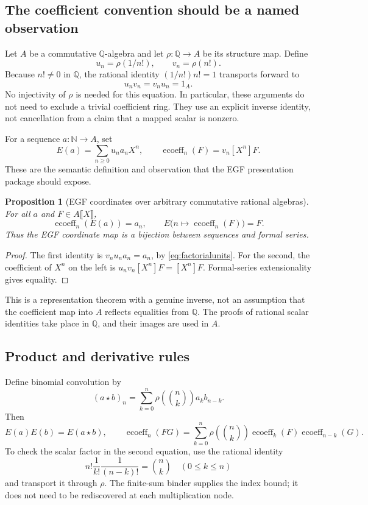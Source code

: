 \documentclass[11pt,a4paper]{article}
\newcommand{\N}{\mathbb N}
\newcommand{\Q}{\mathbb Q}
\newcommand{\ecoeff}{\operatorname{ecoeff}}
\newtheorem{proposition}{Proposition}[section]
\theoremstyle{definition}
\begin{document}
\subsection{The coefficient convention should be a named observation}
Let \(A\) be a commutative \(\Q\)-algebra and let \(\rho:\Q\to A\) be its
structure map. Define
\[
 u_n=\rho(1/n!),\qquad v_n=\rho(n!).
\]
Because \(n!\neq0\) in \(\Q\), the rational identity
\((1/n!)n!=1\) transports forward to
\begin{equation}\label{eq:factorialunits}
 u_nv_n=v_nu_n=1_A.
\end{equation}
No injectivity of \(\rho\) is needed for this equation. In particular, these
arguments do not need to exclude a trivial coefficient ring. They use an
explicit inverse identity, not cancellation from a claim that a mapped scalar
is nonzero.

For a sequence \(a:\N\to A\), set
\[
 E(a)=\sum_{n\geq0}u_na_nX^n,
 \qquad
 \ecoeff_n(F)=v_n[X^n]F.
\]
These are the semantic definition and observation that the EGF presentation
package should expose.

\begin{proposition}[EGF coordinates over arbitrary commutative rational algebras]
For all \(a\) and \(F\in A\llbracket X\rrbracket\),
\[
 \ecoeff_n(E(a))=a_n,\qquad
 E\bigl(n\mapsto\ecoeff_n(F)\bigr)=F.
\]
Thus the EGF coordinate map is a bijection between sequences and formal series.
\end{proposition}
\begin{proof}
The first identity is \(v_nu_na_n=a_n\), by
\eqref{eq:factorialunits}. For the second, the coefficient of \(X^n\) on the
left is \(u_nv_n[X^n]F=[X^n]F\). Formal-series extensionality gives equality.
\end{proof}

This is a representation theorem with a genuine inverse, not an assumption that
the coefficient map into \(A\) reflects equalities from \(\Q\). The proofs of
rational scalar identities take place in \(\Q\), and their images are used in
\(A\).

\subsection{Product and derivative rules}
Define binomial convolution by
\[
 (a\star b)_n=\sum_{k=0}^{n}\rho\!\left(\binom nk\right)a_kb_{n-k}.
\]
Then
\begin{equation}\label{eq:egfrules}
 E(a)E(b)=E(a\star b),\qquad
 \ecoeff_n(FG)=\sum_{k=0}^{n}\rho\!\left(\binom nk\right)
                    \ecoeff_k(F)\ecoeff_{n-k}(G).
\end{equation}
To check the scalar factor in the second equation, use the rational identity
\[
 n!\frac1{k!}\frac1{(n-k)!}=\binom nk
 \quad(0\leq k\leq n)
\]
and transport it through \(\rho\). The finite-sum binder supplies the index
bound; it does not need to be rediscovered at each multiplication node.
\end{document}
